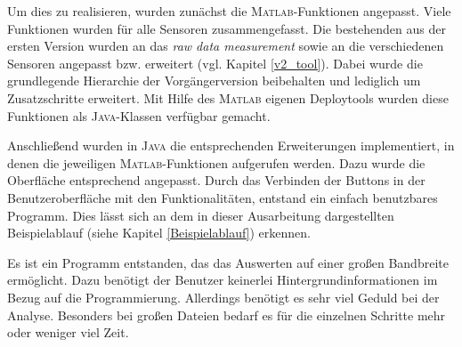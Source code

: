 \documentclass[onecolumn,german]{article}
\begin{document}
Um dies zu realisieren, wurden zunächst die \textsc{Matlab}-Funktionen angepasst. Viele Funktionen wurden für alle Sensoren zusammengefasst. Die bestehenden aus der ersten Version wurden an das \textit{raw data measurement} sowie an die verschiedenen Sensoren angepasst bzw. erweitert (vgl. Kapitel \ref{v2_tool}). Dabei wurde die grundlegende Hierarchie der Vorgängerversion beibehalten und lediglich um Zusatzschritte erweitert. Mit Hilfe des \textsc{Matlab} eigenen Deploytools wurden diese Funktionen als \textsc{Java}-Klassen verfügbar gemacht.\newline

Anschließend wurden in \textsc{Java} die entsprechenden Erweiterungen implementiert, in denen die jeweiligen \textsc{Matlab}-Funktionen aufgerufen werden. Dazu wurde die Oberfläche entsprechend angepasst. Durch das Verbinden der Buttons in der Benutzeroberfläche mit den Funktionalitäten, entstand ein einfach benutzbares Programm. Dies lässt sich an dem in dieser Ausarbeitung dargestellten Beispielablauf (siehe Kapitel \ref{Beispielablauf}) erkennen.\newline

Es ist ein Programm entstanden, das das Auswerten auf einer großen Bandbreite ermöglicht. Dazu benötigt der Benutzer keinerlei Hintergrundinformationen im Bezug auf die Programmierung. Allerdings benötigt es sehr viel Geduld bei der Analyse. Besonders bei großen Dateien bedarf es für die einzelnen Schritte mehr oder weniger viel Zeit. 

\newpage

\nocite{*}
 
\listoffigures
\end{document}
